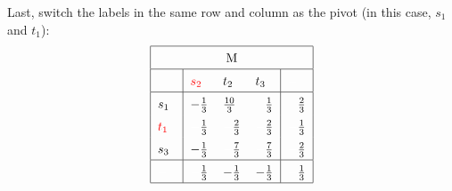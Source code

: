 \documentclass[11pt]{article}
\begin{document}
Last, switch the labels in the same row and column as the pivot (in this case, $s_1$ and $t_1$):
\begin{equation*}
\renewcommand{\arraystretch}{1.5}
\begin{tabular}{ |p{0.5cm}|p{0.5cm} p{0.5cm} p{0.5cm}|p{0.5cm}| }
\hline
\multicolumn{5}{|c|}{M} \\
\hline
\textcolor{white}{.}& \textcolor{red}{$s_2$} & $t_2$ & $t_3$ & $\textcolor{white}{-}$\\
\hline
$s_1$ & $-\frac{1}{3}$ & $\frac{10}{3}$ & $\textcolor{white}{-}$$\frac{1}{3}$ & $\textcolor{white}{-}$$\frac{2}{3}$\\
\textcolor{red}{$t_1$} & $\textcolor{white}{-}$$\frac{1}{3}$ & $\textcolor{white}{-}$$\frac{2}{3}$ & $\textcolor{white}{-}$$\frac{2}{3}$ & $\textcolor{white}{-}$$\frac{1}{3}$\\
$s_3$ & $-\frac{1}{3}$ & $\textcolor{white}{-}$$\frac{7}{3}$ & $\textcolor{white}{-}$$\frac{7}{3}$ & $\textcolor{white}{-}$$\frac{2}{3}$\\
\hline
$\textcolor{white}{-}$ & $\textcolor{white}{-}$$\frac{1}{3}$ & $-\frac{1}{3}$ & $-\frac{1}{3}$ & $\textcolor{white}{-}$$\frac{1}{3}$\\
\hline
\end{tabular}
\end{equation*}
\end{document}
